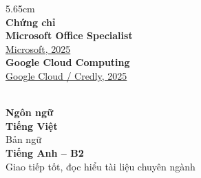 \documentclass[a4paper,10pt]{article}
\newcommand{\headingfont}{\sffamily}
\newcommand{\detailfont}{\sffamily}
\newcommand{\sidehead}[1]{%
  \vspace{7pt}{\color{accent}\rule{1.55cm}{2.2pt}}\\[3pt]%
  {\headingfont\color{white}\small\bfseries #1}\\[4pt]%
}
\begin{document}
\begin{textblock*}{5.65cm}
\sidehead{Chứng chỉ}
{\detailfont\footnotesize\bfseries Microsoft Office Specialist}\\[-1pt]
{\detailfont\scriptsize\color{textweak}\href{https://drive.google.com/file/d/19YHQMBJcSWC0WykoXC2h37FjZIOEMbKy/view?usp=sharing}{Microsoft, 2025}}\\[5pt]
{\detailfont\footnotesize\bfseries Google Cloud Computing}\\[-1pt]
{\detailfont\scriptsize\color{textweak}\href{https://www.credly.com/badges/aa2988ac-c2ae-463f-a11c-4dadc8ed7764/facebook?fbclid=IwY2xjawTFmnpleHRuA2FlbQIxMQBzcnRjBmFwcF9pZBAyMjIwMzkxNzg4MjAwODkyAAEeZcb7swZnaxGZ17nb1KW2MhzzB1sOfRj2faR9Ebqbay1FSVw7SAEcJtbwpGs_aem_YXd10lnpqIzwoMFC8f1BFA}{Google Cloud / Credly, 2025}}

\sidehead{Ngôn ngữ}
{\detailfont\footnotesize\bfseries Tiếng Việt}\\[-1pt]
{\detailfont\scriptsize\color{textweak}Bản ngữ}\\[4pt]
{\detailfont\footnotesize\bfseries Tiếng Anh -- B2}\\[-1pt]
{\detailfont\scriptsize\color{textweak}Giao tiếp tốt, đọc hiểu tài liệu chuyên ngành}

\end{textblock*}
\end{document}
